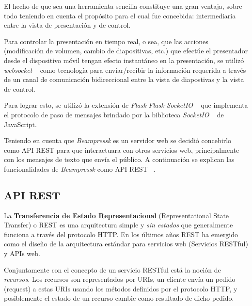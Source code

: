 		El hecho de que sea una herramienta sencilla constituye una gran ventaja, sobre todo teniendo en cuenta el propósito para el cual fue concebida: intermediaria entre la vista de presentación y de control.

		Para controlar la presentación en tiempo real, o sea, que las acciones (modificación de volumen, cambio de diapositivas, etc.) que efectúe el presentador desde el dispositivo móvil tengan efecto instantáneo en la presentación, se utilizó \textit{websocket} ~\cite{websocket} como tecnología para enviar/recibir la información requerida a través de un canal de comunicación bidireccional entre la vista de diapostivas y la vista de control.

		Para lograr esto, se utilizó la extensión de \textit{Flask} \textit{Flask-SocketIO} ~\cite{flasksocket} que implementa el protocolo de paso de mensajes brindado por la biblioteca \textit{SocketIO} ~\cite{socketio} de JavaScript.

	 	Teniendo en cuenta que \textit{Beampressk} es un servidor web se decidió concebirlo como API REST para que interactuara con otros servicios web, principalmente con los mensajes de texto que envía el público. A continuación se explican las funcionalidades de \textit{Beampressk} como API REST ~\cite{book:899251}.
		

		\subsection{API REST} %
		\label{sub:api_rest}


			La \textbf{Transferencia de Estado Representacional} (Representational State Transfer) o REST es una arquitectura simple y \textit{sin estados} que generalmente funciona a través del protocolo HTTP. En los últimos años REST ha emergido como el diseño de la arquitectura estándar para servicios web (Servicios RESTful) y APIs web.

			Conjuntamente con el concepto de un servicio RESTful está la noción de \textit{recursos}. Los recursos son representados por URIs, un cliente envía un pedido (request) a estas URIs usando los métodos definidos por el protocolo HTTP, y posiblemente el estado de un recurso cambie como resultado de dicho pedido. 

